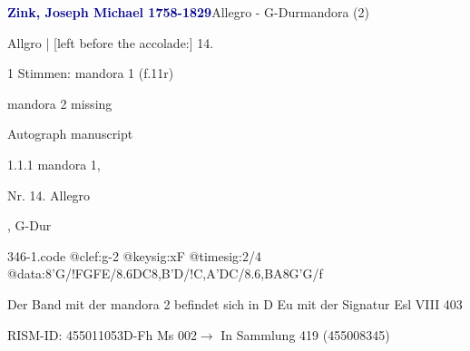 \documentclass[twocolumn]{book}
\begin{document}
\par \vspace{7pt} \textcolor{darkblue}{\textbf{Zink, Joseph Michael  1758-1829}}\hfillplus{\textbf{[346]}}\newline Allegro - G-Dur\newline mandora (2)
\par \begin{itshape}[f.11r, at left:] Allgro | [left before the accolade:] 14.\end{itshape} 
\par \textcolor{darkblue}{}  1 Stimmen: mandora 1  (f.11r)\newline \begin{small} mandora 2 missing\end{small} \newline Autograph manuscript
\par 1.1.1  mandora 1, \begin{itshape}Nr. 14. Allegro\end{itshape}, G-Dur  
\begin{filecontents*}{346-1.code}
@clef:g-2
@keysig:xF
@timesig:2/4
@data:8'G/!FGFE/{8.6DC}8,B'D/!{C,A}'DC/{8.6,BA}8G'G/f
\end{filecontents*}
\newline
%
\par Der Band mit der mandora 2 befindet sich in D Eu mit der Signatur Esl VIII 403
\par RISM-ID: 455011053\newline D-Fh  Ms 002\newline $\rightarrow$ In Sammlung 419 (455008345)
      
\end{document}
